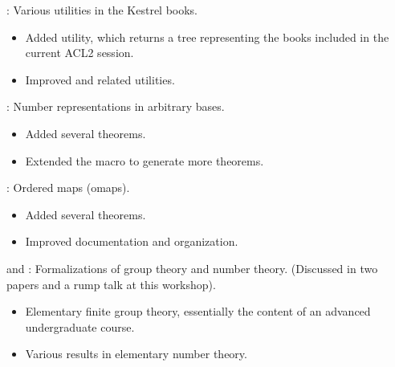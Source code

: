 
\begin{frame}

\implibtitle

:
Various utilities in the Kestrel books.
\begin{itemize}
\item Added  utility,
      which returns a tree representing
      the books included in the current ACL2 session.
\item Improved  and related utilities.
\end{itemize}

\end{frame}


\begin{frame}

\implibtitle

:
Number representations in arbitrary bases.
\begin{itemize}
\item Added several theorems.
\item Extended the  macro to generate more theorems.
\end{itemize}

\end{frame}


\begin{frame}

\implibtitle

:
Ordered maps (omaps).
\begin{itemize}
\item Added several theorems.
\item Improved documentation and organization.
\end{itemize}

\end{frame}


\begin{frame}

\implibtitle

 and :
Formalizations of group theory and number theory.
(Discussed in two papers and a rump talk at this workshop).
\begin{itemize}
\item Elementary finite group theory,
      essentially the content of an advanced undergraduate course.
\item Various results in elementary number theory.
\end{itemize}

\end{frame}

